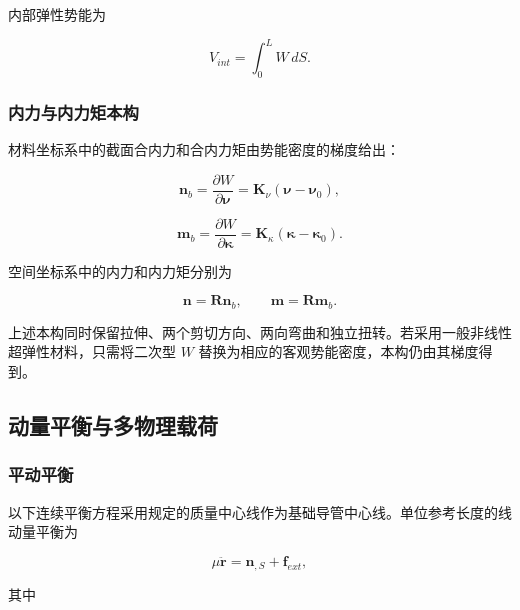 内部弹性势能为

\begin{equation}
\label{eq:rod-1-34}
V_{int} = \int_{0}^{L}W\, dS.
\end{equation}

\subsubsection{内力与内力矩本构}\label{sec:rod-1-3-4}

材料坐标系中的截面合内力和合内力矩由势能密度的梯度给出：

\begin{equation}
\label{eq:rod-1-35}
\mathbf{n}_{b} = \frac{\partial W}{\partial\bm{\nu}} = \mathbf{K}_{\nu}\left( \bm{\nu} - \bm{\nu}_{0} \right),
\end{equation}

\begin{equation}
\label{eq:rod-1-36}
\mathbf{m}_{b} = \frac{\partial W}{\partial\bm{\kappa}} = \mathbf{K}_{\kappa}\left( \bm{\kappa} - \bm{\kappa}_{0} \right).
\end{equation}

空间坐标系中的内力和内力矩分别为

\begin{equation}
\label{eq:rod-1-37}
\mathbf{n} = \mathbf{R}\mathbf{n}_{b},\quad\quad\mathbf{m} = \mathbf{R}\mathbf{m}_{b}.
\end{equation}

上述本构同时保留拉伸、两个剪切方向、两向弯曲和独立扭转。若采用一般非线性超弹性材料，只需将二次型 \(W\) 替换为相应的客观势能密度，本构仍由其梯度得到。

\subsection{动量平衡与多物理载荷}\label{sec:rod-1-4}

\subsubsection{平动平衡}\label{sec:rod-1-4-1}

以下连续平衡方程采用规定的质量中心线作为基础导管中心线。单位参考长度的线动量平衡为

\begin{equation}
\label{eq:rod-1-38}
\mu\ddot{\mathbf{r}} = \mathbf{n}_{,S} + \mathbf{f}_{ext},
\end{equation}

其中

